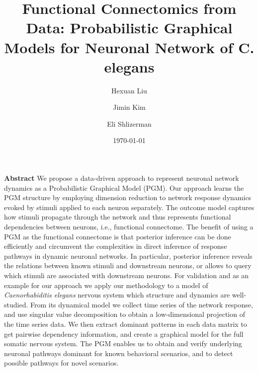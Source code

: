 \documentclass[letterpaper,11pt]{article}
\title{Functional Connectomics from Data: Probabilistic Graphical Models for Neuronal Network of C. elegans}
\author[1]{Hexuan Liu}
\author[2]{Jimin Kim}
\author[1,2]{Eli Shlizerman}
\affil[1]{Department of Applied Mathematics, University of Washington, 98195, USA}
\affil[2]{Department of Electrical Engineering, University of Washington, 98195, USA}
\date{\today}
\begin{document}
\maketitle

\textbf{Abstract} 
We propose a data-driven approach to represent neuronal network dynamics as a Probabilistic Graphical Model (PGM). Our approach learns the PGM structure by employing dimension reduction to network response dynamics evoked by stimuli applied to each neuron separately. The outcome model captures how stimuli propagate through the network and thus represents functional dependencies between neurons, i.e., functional connectome.
The benefit of using a PGM as the functional connectome is that posterior inference can be done efficiently and circumvent the complexities in direct inference of response pathways in dynamic neuronal networks. In particular, posterior inference reveals the relations between known stimuli and downstream neurons, or allows to query which stimuli are associated with downstream neurons. For validation and as an example for our approach we apply our methodology to a model of \textit{Caenorhabiditis elegans} nervous system which structure and dynamics are well-studied. From its dynamical model we collect time series of the network response, and use singular value decomposition to obtain a low-dimensional projection of the time series data. We then extract dominant patterns in each data matrix to get pairwise dependency information, and create a graphical model for the full somatic nervous system. The PGM enables us to obtain and verify underlying neuronal pathways dominant for known behavioral scenarios, and to detect possible pathways for novel scenarios.
\end{document}
